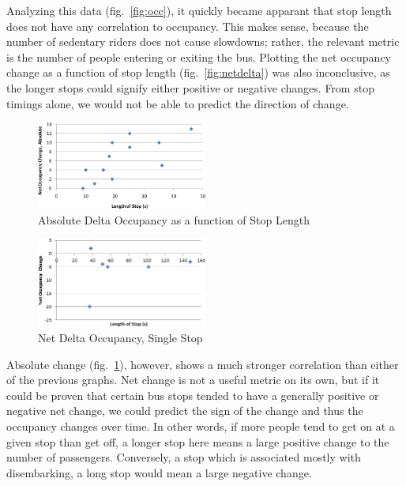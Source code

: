 \documentclass[11pt,journal,compsoc]{IEEEtran} %
\begin{document}
    Analyzing this data (fig.~\ref{fig:occ}), it quickly became apparant that stop length does not have any correlation to occupancy.
	This makes sense, because the number of sedentary riders does not cause slowdowns; rather, the relevant metric is the number of people entering or exiting the bus.
	Plotting the net occupancy change as a function of stop length (fig.~\ref{fig:netdelta}) was also inconclusive, as the longer stops could signify either positive or negative changes.
	From stop timings alone, we would not be able to predict the direction of change.

    \pagebreak
    
	\begin{figure}[!t]
	  \includegraphics[width=0.5\textwidth]{absdelta}
      \caption{Absolute Delta Occupancy as a function of Stop Length}
      \label{fig:absdelta}
	\end{figure}

    \begin{figure}[!t]
	  \includegraphics[width=0.5\textwidth]{onestopcrop}
      \caption{Net Delta Occupancy, Single Stop}
      \label{fig:onestop}
	\end{figure}
    
	Absolute change (fig.~\ref{fig:absdelta}), however, shows a much stronger correlation than either of the previous graphs.
    Net change is not a useful metric on its own, but if it could be proven that certain bus stops tended to have a generally positive or negative net change, we could predict the sign of the change and thus the occupancy changes over time.
	In other words, if more people tend to get on at a given stop than get off, a longer stop here means a large positive change to the number of passengers.
	Conversely, a stop which is associated mostly with disembarking, a long stop would mean a large negative change.
\end{document}
